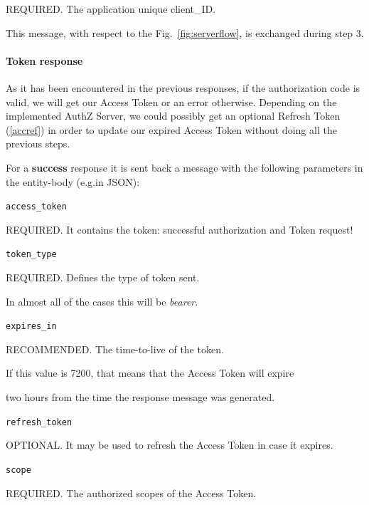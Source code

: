 \documentclass[a4paper,12pt]{article}
\def\myfig#1{Fig.~#1\xspace}
\begin{document}
\hspace{0.5cm}REQUIRED. The application unique client\_ID.

\vspace{0.5cm}

\noindent This message, with respect to the \myfig{\ref{fig:serverflow}}, is exchanged during step 3. 


\paragraph{Token response}
As it has been encountered in the previous responses, if the authorization code is valid, we will get our Access Token or an error otherwise. Depending on the implemented AuthZ Server, we could possibly get an optional Refresh Token (\ref{accref}) in order to update our expired Access Token without doing all the previous steps.

For a \textbf{success} response it is sent back a message with the following parameters in the entity-body (e.g.in JSON):

\texttt{access\_token}

\hspace{0.5cm}REQUIRED. It contains the token: successful authorization and Token request! 

\texttt{token\_type}

\hspace{0.5cm}REQUIRED. Defines the type of token sent.

\hspace{0.5cm}In almost all of the cases this will be \textit{bearer}.

\texttt{expires\_in}

\hspace{0.5cm}RECOMMENDED. The time-to-live of the token.

\hspace{0.5cm}If this value is 7200, that means that the Access Token will expire

\hspace{0.5cm}two hours from the time the response message was generated.

\vspace{0.5cm}

\texttt{refresh\_token}

\hspace{0.5cm}OPTIONAL. It may be used to refresh the Access Token in case it expires.

\texttt{scope}

\hspace{0.5cm}REQUIRED. The authorized scopes of the Access Token.
\end{document}
